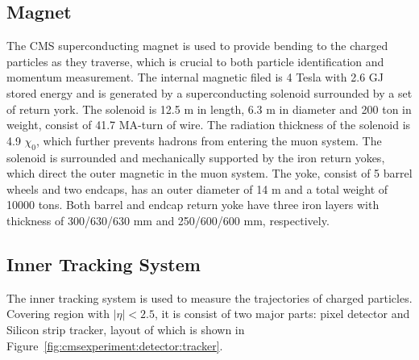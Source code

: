 



\subsection{Magnet}
The CMS superconducting magnet \cite{cms:magnetTdr:Acquistapace:1997fm} is used to provide bending to the charged particles as they traverse, which is crucial to both particle identification and momentum measurement. The internal magnetic filed is 4 Tesla with 2.6 GJ stored energy and is generated by a superconducting solenoid surrounded by a set of return york. The solenoid is 12.5 m in length, 6.3 m in diameter and 200 ton in weight, consist of 41.7 MA-turn of wire. The radiation thickness of the solenoid is 4.9 $\chi_0$, which further prevents hadrons from entering the muon system. The solenoid is surrounded and mechanically supported by the iron return yokes, which direct the outer magnetic in the muon system. The yoke, consist of 5 barrel wheels and two endcaps, has an outer diameter of 14 m and a total weight of 10000 tons. Both barrel and endcap return yoke have three iron layers with thickness of 300/630/630 mm and 250/600/600 mm, respectively.



\subsection{Inner Tracking System}
The inner tracking system \cite{cms:trackerTdr:CMS:1997tlf} is used to measure the trajectories of charged particles. Covering region with $|\eta|<2.5$, it is consist of two major parts: pixel detector and Silicon strip tracker, layout of which is shown in Figure~\ref{fig:cmsexperiment:detector:tracker}. 


